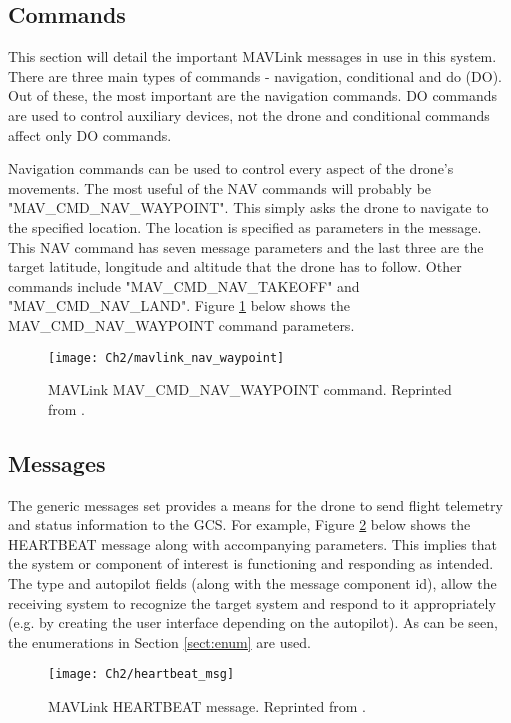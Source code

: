 \subsection{Commands}\label{subsect:mavlinkcommands}

This section will detail the important MAVLink messages in use in this system. There are three main types of commands - navigation, conditional and do (DO). Out of these, the most important are the navigation commands. DO commands are used to control auxiliary devices, not the drone and conditional commands affect only DO commands.

Navigation commands can be used to control every aspect of the drone’s movements. The most useful of the NAV commands will probably be "MAV\_CMD\_NAV\_WAYPOINT". This simply asks the drone to navigate to the specified location. The location is specified as parameters in the message. This NAV command has seven message parameters and the last three are the target latitude, longitude and altitude that the drone has to follow. Other commands include "MAV\_CMD\_NAV\_TAKEOFF" and "MAV\_CMD\_NAV\_LAND". Figure \ref{fig:waypoint} below shows the MAV\_CMD\_NAV\_WAYPOINT command parameters.

\begin{figure}[t]
	\texttt{[image: Ch2/mavlink\_nav\_waypoint]}
	\caption[MAVLink MAV\_CMD\_NAV\_WAYPOINT command.]{MAVLink MAV\_CMD\_NAV\_WAYPOINT command. Reprinted from \protect{}.}
	\label{fig:waypoint}
\end{figure}
\FloatBarrier

\subsection{Messages}

The generic messages set provides a means for the drone to send flight telemetry and status information to the GCS. For example, Figure \ref{fig:heartbeat} below shows the HEARTBEAT message along with accompanying parameters. This implies that the system or component of interest is functioning and responding as intended. The type and autopilot fields (along with the message component id), allow the receiving system to recognize the target system and respond to it appropriately (e.g. by creating the user interface depending on the autopilot). As can be seen, the enumerations in Section \ref{sect:enum} are used.

\begin{figure}[t]
	\texttt{[image: Ch2/heartbeat\_msg]}
	\caption[MAVLink HEARTBEAT message.]{MAVLink HEARTBEAT message. Reprinted from \protect{}.}
	\label{fig:heartbeat}
\end{figure}
\FloatBarrier


